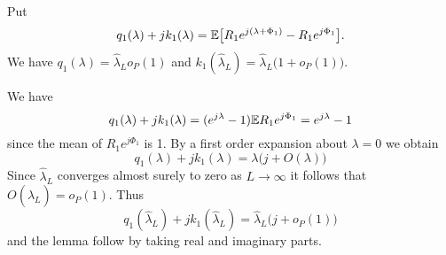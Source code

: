 \documentclass[draftcls, onecolumn, 11pt]{IEEEtran}
\begin{document}
\begin{IEEEproof}
\end{IEEEproof}

\begin{lemma}\label{lem:q1k1parts}
Put
\[
q_1(\lambda) + j k_1(\lambda) = {\mathbb E}\big[ R_1 e^{j(\lambda + \Phi_1)} - R_1 e^{j\Phi_1}  \big].
\]
We have $q_1(\lambda) = \hat{\lambda}_L o_P(1)$ and $k_1(\hat{\lambda}_L) = \hat{\lambda}_L\big(1 + o_P(1) \big)$.
\end{lemma}
\begin{IEEEproof}
We have
\[
q_1(\lambda) + j k_1(\lambda) = (e^{j\lambda} - 1) {\mathbb E} R_1e^{j\Phi_1} = e^{j\lambda} - 1
\]
since the mean of $R_1e^{j\Phi_1}$ is 1.  By a first order expansion about $\lambda = 0$ we obtain
\[
q_1(\lambda) + j k_1(\lambda) = \lambda\big( j + O(\lambda) \big)
\]
Since $\hat{\lambda}_L$ converges almost surely to zero as $L\rightarrow\infty$ it follows that $O(\hat{\lambda}_L) = o_P(1)$.  Thus
\[
q_1(\hat{\lambda}_L) + j k_1(\hat{\lambda}_L) = \hat{\lambda}_L\big( j + o_P(1) \big)
\]
and the lemma follow by taking real and imaginary parts.
\end{IEEEproof}
\end{document}
